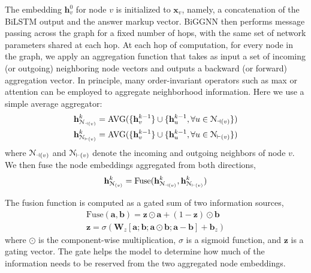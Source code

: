 \documentclass[journal]{IEEEtran}
\let\vec\mathbf
\begin{document}
The embedding $\vec{h}_v^{0}$ for node $v$ is initialized to $\vec{x}_v$, namely, a concatenation of the BiLSTM output and the answer markup vector. 
BiGGNN then performs message passing across the graph for a fixed number of hops, with the same set of network parameters shared at each hop.
At each hop of computation, for every node in the graph, we apply an aggregation function that takes as input a set of incoming (or outgoing) neighboring node vectors and outputs a backward (or forward) aggregation vector.
In principle, many order-invariant operators such as max or attention \cite{velivckovic2017graph} can be employed to aggregate neighborhood information.
Here we use a simple average aggregator:
\begin{equation}\label{eq:node_agg}
\begin{aligned}
\vec{h}^k_{\EuScript{N}_{\dashv(v)}}=\text{AVG}(\{\vec{h}^{k-1}_v\} \cup \{\vec{h}^{k-1}_u, \forall u \in \EuScript{N}_{\dashv(v)}\})\\
\vec{h}^k_{\EuScript{N}_{\vdash(v)}}=\text{AVG}(\{\vec{h}^{k-1}_v\} \cup \{\vec{h}^{k-1}_u, \forall u \in \EuScript{N}_{\vdash(v)}\})
\end{aligned}
\end{equation}
where $\EuScript{N}_{\dashv(v)}$ and $\EuScript{N}_{\vdash(v)}$ denote the incoming and outgoing neighbors of node $v$. 
We then fuse the node embeddings aggregated from both directions,
\begin{equation}
\begin{aligned}
\vec{h}^k_{\EuScript{N}_{(v)}}=\text{Fuse}(\vec{h}^k_{\EuScript{N}_{\dashv(v)}}, \vec{h}^k_{\EuScript{N}_{\vdash(v)}})  
\end{aligned}
\end{equation}

The fusion function is computed as a gated sum of two information sources,
\begin{equation}
\begin{aligned}
\text{Fuse}(\vec{a}, \vec{b}) = \vec{z} \odot \vec{a} + (1-\vec{z}) \odot \vec{b}\\
\vec{z} = \sigma(\vec{W}_{\!z} [\vec{a}; \vec{b}; \vec{a} \odot \vec{b}; \vec{a}-\vec{b}]+\vec{b}_z)
\end{aligned}
\end{equation}
where $\odot$ is the component-wise multiplication, $\sigma$ is a sigmoid function, and $\vec{z}$ is a gating vector.
The gate helps the model to determine how much of the information needs to be reserved from the two aggregated node embeddings.
\end{document}
